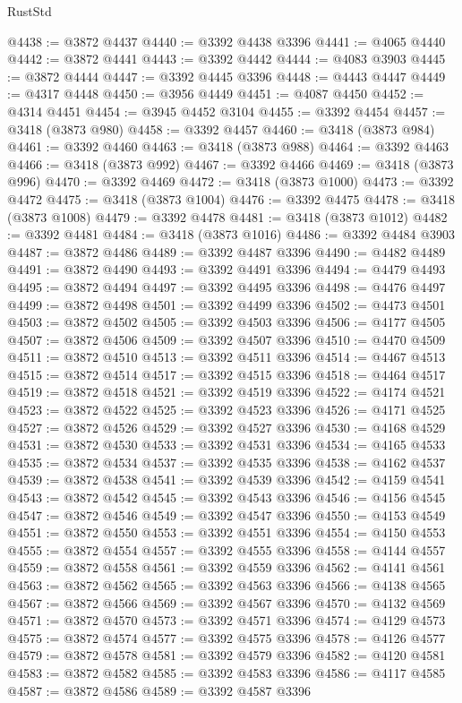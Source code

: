 \begin{lexlean}{RustStd}
\begin{coremodule}
@4438 := @3872 @4437
@4440 := @3392 @4438 @3396
@4441 := @4065 @4440
@4442 := @3872 @4441
@4443 := @3392 @4442
@4444 := @4083 @3903
@4445 := @3872 @4444
@4447 := @3392 @4445 @3396
@4448 := @4443 @4447
@4449 := @4317 @4448
@4450 := @3956 @4449
@4451 := @4087 @4450
@4452 := @4314 @4451
@4454 := @3945 @4452 @3104
@4455 := @3392 @4454
@4457 := @3418 (@3873 @980)
@4458 := @3392 @4457
@4460 := @3418 (@3873 @984)
@4461 := @3392 @4460
@4463 := @3418 (@3873 @988)
@4464 := @3392 @4463
@4466 := @3418 (@3873 @992)
@4467 := @3392 @4466
@4469 := @3418 (@3873 @996)
@4470 := @3392 @4469
@4472 := @3418 (@3873 @1000)
@4473 := @3392 @4472
@4475 := @3418 (@3873 @1004)
@4476 := @3392 @4475
@4478 := @3418 (@3873 @1008)
@4479 := @3392 @4478
@4481 := @3418 (@3873 @1012)
@4482 := @3392 @4481
@4484 := @3418 (@3873 @1016)
@4486 := @3392 @4484 @3903
@4487 := @3872 @4486
@4489 := @3392 @4487 @3396
@4490 := @4482 @4489
@4491 := @3872 @4490
@4493 := @3392 @4491 @3396
@4494 := @4479 @4493
@4495 := @3872 @4494
@4497 := @3392 @4495 @3396
@4498 := @4476 @4497
@4499 := @3872 @4498
@4501 := @3392 @4499 @3396
@4502 := @4473 @4501
@4503 := @3872 @4502
@4505 := @3392 @4503 @3396
@4506 := @4177 @4505
@4507 := @3872 @4506
@4509 := @3392 @4507 @3396
@4510 := @4470 @4509
@4511 := @3872 @4510
@4513 := @3392 @4511 @3396
@4514 := @4467 @4513
@4515 := @3872 @4514
@4517 := @3392 @4515 @3396
@4518 := @4464 @4517
@4519 := @3872 @4518
@4521 := @3392 @4519 @3396
@4522 := @4174 @4521
@4523 := @3872 @4522
@4525 := @3392 @4523 @3396
@4526 := @4171 @4525
@4527 := @3872 @4526
@4529 := @3392 @4527 @3396
@4530 := @4168 @4529
@4531 := @3872 @4530
@4533 := @3392 @4531 @3396
@4534 := @4165 @4533
@4535 := @3872 @4534
@4537 := @3392 @4535 @3396
@4538 := @4162 @4537
@4539 := @3872 @4538
@4541 := @3392 @4539 @3396
@4542 := @4159 @4541
@4543 := @3872 @4542
@4545 := @3392 @4543 @3396
@4546 := @4156 @4545
@4547 := @3872 @4546
@4549 := @3392 @4547 @3396
@4550 := @4153 @4549
@4551 := @3872 @4550
@4553 := @3392 @4551 @3396
@4554 := @4150 @4553
@4555 := @3872 @4554
@4557 := @3392 @4555 @3396
@4558 := @4144 @4557
@4559 := @3872 @4558
@4561 := @3392 @4559 @3396
@4562 := @4141 @4561
@4563 := @3872 @4562
@4565 := @3392 @4563 @3396
@4566 := @4138 @4565
@4567 := @3872 @4566
@4569 := @3392 @4567 @3396
@4570 := @4132 @4569
@4571 := @3872 @4570
@4573 := @3392 @4571 @3396
@4574 := @4129 @4573
@4575 := @3872 @4574
@4577 := @3392 @4575 @3396
@4578 := @4126 @4577
@4579 := @3872 @4578
@4581 := @3392 @4579 @3396
@4582 := @4120 @4581
@4583 := @3872 @4582
@4585 := @3392 @4583 @3396
@4586 := @4117 @4585
@4587 := @3872 @4586
@4589 := @3392 @4587 @3396

\end{coremodule}
\end{lexlean}
